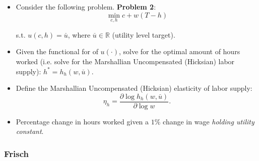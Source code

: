 \documentclass[11pt]{article}
\begin{document}
\begin{itemize}

\item Consider the following problem. \textbf{Problem 2}:
\begin{equation*}
\min_{c,h}c+w(T-h)
\end{equation*}

s.t. $u\left( c,h\right) =\overset{\_}{u}$, where $\overset{\_}{u}\in \mathbb{R}$ (utility level target).

\item Given the functional for of $u\left( \cdot \right) $, solve for the
optimal amount of hours worked (i.e. solve for the Marshallian Uncompensated (Hicksian) labor supply): $h^{\ast }=h_{h}\left( w,\overset{\_}{u}\right)$.

\item Define the Marshallian Uncompensated (Hicksian) elasticity of labor supply:
\begin{equation}
\eta _{h}=\frac{\partial \log h_{h}\left( w,\overset{\_}{u}\right) }{
\partial \log w}.
\end{equation}

\item Percentage change in hours worked given a $1\%$ change in wage \textit{
holding utility constant}.
\end{itemize}

\subsubsection*{Frisch}
\end{document}
